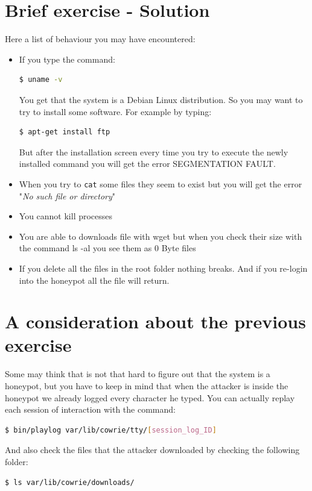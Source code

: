 \documentclass[epsfig,a4paper,11pt,titlepage,oneside,openany]{book}
\begin{document}
\section{Brief exercise - Solution}
Here a list of behaviour you may have encountered:
\begin{itemize}
\itemsep0em 
\item If you type the command:
	\begin{lstlisting}[language=bash]
$ uname -v
	\end{lstlisting}
	You get that the system is a Debian Linux distribution. So you may want to try to install some software. For example by typing:
	\begin{lstlisting}[language=bash]
$ apt-get install ftp 
	\end{lstlisting}
	But after the installation screen every time you try to execute the newly installed command you will get the error SEGMENTATION FAULT.
\item When you try to \texttt{cat} some files they seem to exist but you will get the error "\textit{No such file or directory}"
\item You cannot kill processes
\item You are able to downloads  file with wget but when you check their size with the command ls -al you see them as 0 Byte files
\item If you delete all the files in the root folder nothing breaks. And if you re-login into the honeypot all the file will return.
\end{itemize}

\section{A consideration about the previous exercise}
Some may think that is not that hard to figure out that the system is a honeypot, but you have to keep in mind that when the attacker is inside the honeypot we already logged every character he typed.
You can actually replay each session of interaction with the command:
\begin{lstlisting}[language=bash]
$ bin/playlog var/lib/cowrie/tty/[session_log_ID]
\end{lstlisting}
And also check the files that the attacker downloaded by checking the following folder:

\begin{lstlisting}[language=bash]
$ ls var/lib/cowrie/downloads/
\end{lstlisting}
\end{document}
